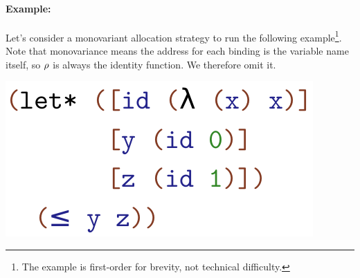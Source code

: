 \paragraph{Example:} Let's consider a monovariant allocation strategy to run the following example\footnote{The example is first-order for brevity, not technical difficulty.}.
Note that monovariance means the address for each binding is the variable name itself, so $\rho$ is always the identity function. We therefore omit it.

\begin{center}
  \includegraphics[scale=0.5]{example0}
\end{center}


